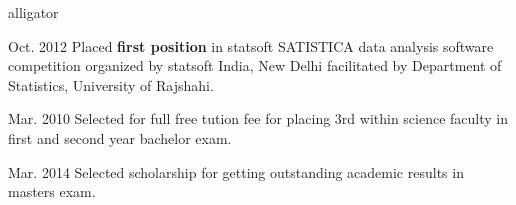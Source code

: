

\begin{cvparagraph}
\begin{labeling}{alligator}
\item [Oct. 2012] Placed \textbf{first position} in statsoft SATISTICA data analysis software competition organized by statsoft India, New Delhi facilitated by Department of Statistics, University of Rajshahi.
\item [Mar. 2010] Selected for full free tution fee for placing 3rd within science faculty in first and second year bachelor exam.
\item [Mar. 2014] Selected scholarship for getting outstanding academic results in masters exam.
\end{labeling}
\end{cvparagraph}